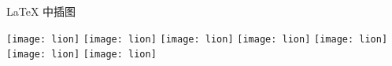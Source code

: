 \documentclass{ctexart}
\begin{document}
\LaTeX{} 中插图

\texttt{[image: lion]}
\texttt{[image: lion]}
\texttt{[image: lion]}
\texttt{[image: lion]}
\texttt{[image: lion]}
\texttt{[image: lion]}
\texttt{[image: lion]}
\end{document}

